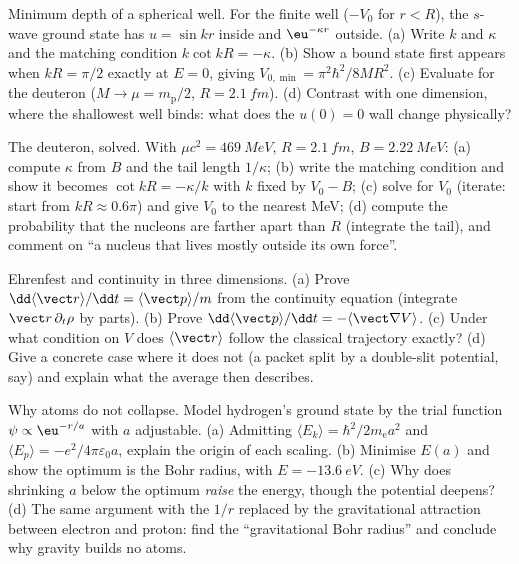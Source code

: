 \begin{exercise}[$\star\star$]\label{exo:b3:schrodinger-three-dimensions:9}
Minimum depth of a spherical well. For the finite well ($-V_0$ for
$r < R$), the $s$-wave ground state has $u = \sin kr$ inside and
$\eu^{-\kappa r}$ outside. (a) Write $k$ and $\kappa$ and the
matching condition $k\cot kR = -\kappa$. (b) Show a bound state
first appears when $kR = \pi/2$ exactly at $E = 0$, giving
$V_{0,\min} = \pi^2\hbar^2/8MR^2$. (c) Evaluate for the deuteron
($M \to \mu = m_{\text{p}}/2$, $R = \qty{2.1}{fm}$). (d) Contrast
with one dimension, where the shallowest well binds: what does the
$u(0) = 0$ wall change physically?
\end{exercise}

\begin{exercise}[$\star\star\star$]\label{exo:b3:schrodinger-three-dimensions:10}
The deuteron, solved. With $\mu c^2 = \qty{469}{MeV}$, $R =
\qty{2.1}{fm}$, $B = \qty{2.22}{MeV}$: (a) compute $\kappa$ from $B$
and the tail length $1/\kappa$; (b) write the matching condition and
show it becomes $\cot kR = -\kappa/k$ with $k$ fixed by $V_0 - B$;
(c) solve for $V_0$ (iterate: start from $kR \approx 0.6\pi$) and
give $V_0$ to the nearest MeV; (d) compute the probability that the
nucleons are farther apart than $R$ (integrate the tail), and
comment on ``a nucleus that lives mostly outside its own force''.
\end{exercise}

\begin{exercise}[$\star\star\star$]\label{exo:b3:schrodinger-three-dimensions:11}
Ehrenfest and continuity in three dimensions. (a) Prove
$\dd\langle\vect r\rangle/\dd t = \langle\vect p\rangle/m$ from the
continuity equation (integrate $\vect r\,\partial_t\rho$ by parts).
(b) Prove $\dd\langle\vect p\rangle/\dd t =
-\langle\vect\nabla V\rangle$. (c) Under what condition on $V$ does
$\langle\vect r\rangle$ follow the classical trajectory exactly? (d)
Give a concrete case where it does not (a packet split by a
double-slit potential, say) and explain what the average then
describes.
\end{exercise}

\begin{exercise}[$\star\star\star$]\label{exo:b3:schrodinger-three-dimensions:12}
Why atoms do not collapse. Model hydrogen's ground state by the
trial function $\psi \propto \eu^{-r/a}$ with $a$ adjustable. (a)
Admitting $\langle E_k\rangle = \hbar^2/2m_{\text{e}}a^2$ and
$\langle E_p\rangle = -e^2/4\pi\varepsilon_0a$, explain the origin
of each scaling. (b) Minimise $E(a)$ and show the optimum is the
Bohr radius, with $E = \qty{-13.6}{eV}$. (c) Why does shrinking $a$
below the optimum \emph{raise} the energy, though the potential
deepens? (d) The same argument with the $1/r$ replaced by the
gravitational attraction between electron and proton: find the
``gravitational Bohr radius'' and conclude why gravity builds no
atoms.
\end{exercise}

